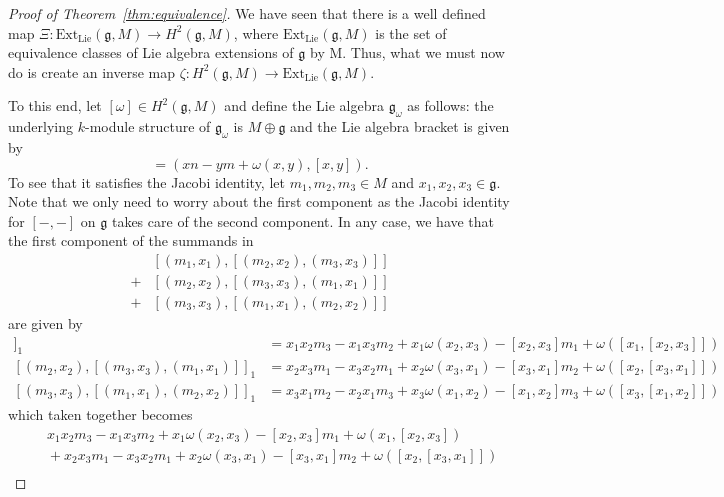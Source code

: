 \begin{proof}[Proof of Theorem~\ref{thm:equivalence}]
  We have seen that there is a well defined map $ \Xi: \text{Ext}_{\text{Lie}}(\mathfrak{g}, M) \to H^2(\mathfrak{g}, M) $, where $ \text{Ext}_{\text{Lie}}(\mathfrak{g}, M) $ is the set of equivalence classes of Lie algebra extensions of $ \mathfrak{g} $ by M. Thus, what we must now do is create an inverse map $ \zeta: H^2(\mathfrak{g}, M) \to \text{Ext}_{\text{Lie}}(\mathfrak{g}, M) $.

  To this end, let $ [\omega] \in H^2(\mathfrak{g}, M) $ and define the Lie algebra $ \mathfrak{g}_\omega $ as follows: the underlying $ k $-module structure of $ \mathfrak{g}_\omega $ is $ M \oplus \mathfrak{g} $ and the Lie algebra bracket is given by
  \begin{equation}
    [(m, x), (n, y)] = (xn - ym + \omega(x,y), [x,y]).
  \end{equation}
  To see that it satisfies the Jacobi identity, let $ m_1, m_2, m_3 \in M $ and $ x_1, x_2, x_3 \in \mathfrak{g} $. Note that we only need to worry about the first component as the Jacobi identity for $ [-, -] $ on $ \mathfrak{g} $ takes care of the second component. In any case, we have that the first component of the summands in
  \begin{align*}
    &[(m_1, x_1), [(m_2, x_2), (m_3, x_3)]]\\+ &
    [(m_2, x_2), [(m_3, x_3), (m_1, x_1)]]\\ +&
    [(m_3, x_3), [(m_1, x_1), (m_2, x_2)]]
  \end{align*}
  are given by
  \begin{align*}
    [(m_1, x_1), [(m_2, x_2), (m_3, x_3)]]_1 &= x_1x_2m_3 - x_1x_3m_2 + x_1\omega(x_2, x_3) - [x_2, x_3]m_1 + \omega([x_1, [x_2, x_3]])\\
    [(m_2, x_2), [(m_3, x_3), (m_1, x_1)]]_1 &= x_2x_3m_1 - x_3x_2m_1 + x_2\omega(x_3, x_1) - [x_3, x_1]m_2 +\omega([x_2, [x_3, x_1]])\\
    [(m_3, x_3), [(m_1, x_1), (m_2, x_2)]]_1 &= x_3x_1m_2 - x_2x_1m_3 + x_3\omega(x_1, x_2) - [x_1, x_2]m_3 + \omega([x_3, [x_1, x_2]])
  \end{align*}
  which taken together becomes
  \begin{align*}
    &\quad x_1x_2m_3 - x_1x_3m_2 + x_1\omega(x_2, x_3) - [x_2, x_3]m_1 + \omega(x_1, [x_2, x_3])\\
    &\quad+x_2x_3m_1 - x_3x_2m_1 + x_2\omega(x_3, x_1) - [x_3, x_1]m_2 + \omega([x_2, [x_3, x_1]]) \\

\end{align*}
\end{proof}
